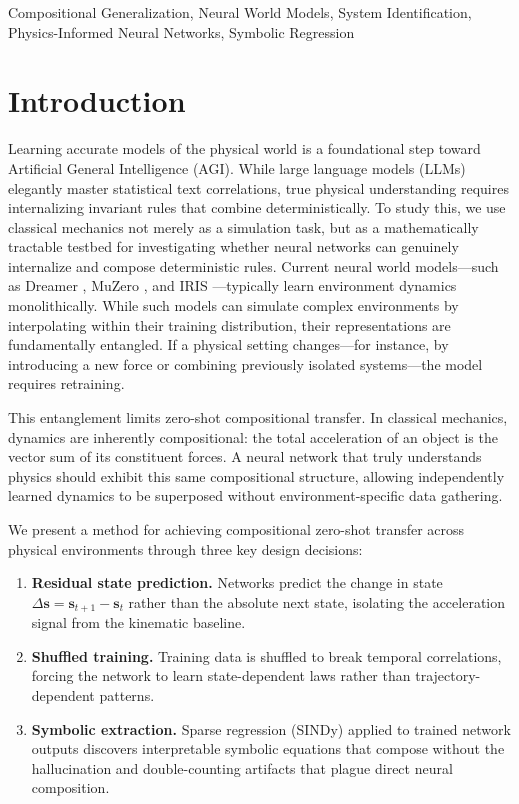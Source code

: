 \documentclass[twoside,11pt]{article}
\begin{document}
\begin{keywords}
  Compositional Generalization, Neural World Models, System Identification, Physics-Informed Neural Networks, Symbolic Regression
\end{keywords}

\section{Introduction}
\label{sec:intro}

Learning accurate models of the physical world is a foundational step toward Artificial General Intelligence (AGI). While large language models (LLMs) elegantly master statistical text correlations, true physical understanding requires internalizing invariant rules that combine deterministically. To study this, we use classical mechanics not merely as a simulation task, but as a mathematically tractable testbed for investigating whether neural networks can genuinely internalize and compose deterministic rules. Current neural world models---such as Dreamer \citep{hafner2020dreamer}, MuZero \citep{schrittwieser2020muzero}, and IRIS \citep{micheli2023iris}---typically learn environment dynamics monolithically. While such models can simulate complex environments by interpolating within their training distribution, their representations are fundamentally entangled. If a physical setting changes---for instance, by introducing a new force or combining previously isolated systems---the model requires retraining.

This entanglement limits zero-shot compositional transfer. In classical mechanics, dynamics are inherently compositional: the total acceleration of an object is the vector sum of its constituent forces. A neural network that truly understands physics should exhibit this same compositional structure, allowing independently learned dynamics to be superposed without environment-specific data gathering.

We present a method for achieving compositional zero-shot transfer across physical environments through three key design decisions:

\begin{enumerate}
    \item \textbf{Residual state prediction.} Networks predict the change in state $\Delta \mathbf{s} = \mathbf{s}_{t+1} - \mathbf{s}_t$ rather than the absolute next state, isolating the acceleration signal from the kinematic baseline.
    \item \textbf{Shuffled training.} Training data is shuffled to break temporal correlations, forcing the network to learn state-dependent laws rather than trajectory-dependent patterns.
    \item \textbf{Symbolic extraction.} Sparse regression (SINDy) \citep{brunton2016sindy} applied to trained network outputs discovers interpretable symbolic equations that compose without the hallucination and double-counting artifacts that plague direct neural composition.
\end{enumerate}
\end{document}
